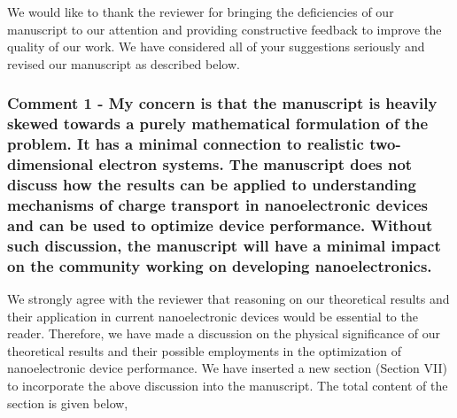 \documentclass{article}
\begin{document}
We would like to thank the reviewer for bringing the deficiencies of our manuscript to our attention and providing constructive feedback to improve the quality of our work. We have considered all of your suggestions seriously and revised our manuscript as described below.

\subsubsection*{Comment 1 -
\color{RoyalBlue} My concern is that the manuscript is heavily skewed towards a purely mathematical formulation of the problem. It has a minimal connection to realistic two-dimensional electron systems. The manuscript does not discuss how the results can be applied to understanding mechanisms of charge transport in nanoelectronic devices and can be used to optimize device performance. Without such discussion, the manuscript will have a minimal impact on the community working on developing nanoelectronics.}

We strongly agree with the reviewer that reasoning on our theoretical results and their application in current nanoelectronic devices would be essential to the reader. Therefore, we have made a discussion on the physical significance of our theoretical results and their possible employments in the optimization of nanoelectronic device performance. We have inserted a new section (Section VII) to incorporate the above discussion into the manuscript. The total content of the section is given below,
\end{document}
